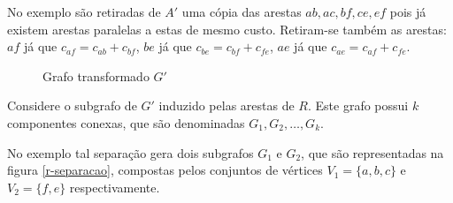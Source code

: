         No exemplo são retiradas de $A'$ uma cópia das arestas $ab, ac, bf, ce, ef$ pois já existem arestas paralelas a estas de mesmo custo.
        Retiram-se também as arestas: $af$ já que $c_{af} = c_{ab} + c_{bf}$, $be$ já que $c_{be} = c_{bf} + c_{fe}$, $ae$ já que $c_{ae} = c_{af} + c_{fe}$.


        \begin{figure}[H]
            \centering
            \caption{Grafo transformado $G'$}
            \label{grafo-transformado}
        \end{figure}
        
        Considere o subgrafo de $G'$ induzido pelas arestas de $R$. Este grafo possui $k$ componentes conexas, que são denominadas $G_1, G_2, \dots, G_k$. 

        No exemplo tal separação gera dois subgrafos $G_1$ e $G_2$, que são representadas na figura \ref{r-separacao}, compostas pelos conjuntos de vértices $V_1 = \{a, b, c\}$ e $V_2 = \{f, e\}$ respectivamente.

